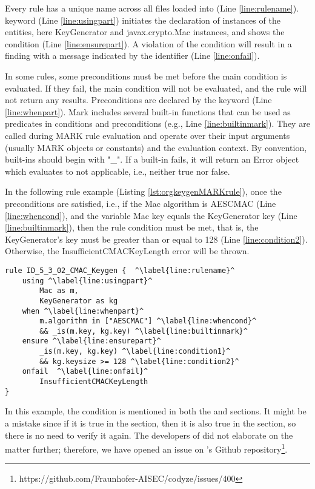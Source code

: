 Every rule has a unique name across all \MARK{} files loaded into \codyze{} (Line \ref{line:rulename}).  keyword (Line \ref{line:usingpart}) initiates the declaration of instances of the \MARK{} entities, here KeyGenerator and javax.crypto.Mac instances, and  shows the condition (Line \ref{line:ensurepart}). A violation of the condition will result in a finding with a message indicated by the  identifier (Line \ref{line:onfail}). 


In some rules, some preconditions must be met before the main condition is evaluated. If they fail, the main condition will not be evaluated, and the rule will not return any results. Preconditions are declared by the  keyword (Line \ref{line:whenpart}). Mark includes several built-in functions that can be used as predicates in conditions and preconditions (e.g., Line \ref{line:builtinmark}). They are called during MARK rule evaluation and operate over their input arguments (usually MARK objects or constants) and the evaluation context. By convention, built-ins should begin with "\_". If a built-in fails, it will return an Error object which evaluates to not applicable, i.e., neither true nor false. 

In the following rule example (Listing \ref{lst:orgkeygenMARKrule}), once the preconditions are satisfied, i.e., if the Mac algorithm is AESCMAC (Line \ref{line:whencond}), and the variable Mac key equals the KeyGenerator key (Line \ref{line:builtinmark}), then the rule condition must be met, that is, the KeyGenerator's key must be greater than or equal to 128 (Line \ref{line:condition2}). Otherwise, the InsufficientCMACKeyLength error will be thrown.

\begin{lstlisting}[language=MARK2,caption= A \MARK{} rule associated with javax.crypto.KeyGenerator class from Bouncy Castle ruleset \cite{codyzegit}., label={lst:orgkeygenMARKrule}, escapechar=^]
rule ID_5_3_02_CMAC_Keygen {  ^\label{line:rulename}^
    using ^\label{line:usingpart}^
        Mac as m,
        KeyGenerator as kg
    when ^\label{line:whenpart}^
        m.algorithm in ["AESCMAC"] ^\label{line:whencond}^
        && _is(m.key, kg.key) ^\label{line:builtinmark}^
    ensure ^\label{line:ensurepart}^
        _is(m.key, kg.key) ^\label{line:condition1}^
        && kg.keysize >= 128 ^\label{line:condition2}^
    onfail  ^\label{line:onfail}^
        InsufficientCMACKeyLength 
}
\end{lstlisting}

In this example, the condition  is mentioned in both the  and  sections. It might be a mistake since if it is true in the  section, then it is also true in the  section, so there is no need to verify it again. The developers of \codyze{} did not elaborate on the matter further; therefore, we have opened an issue on \codyze{}'s Github repository\footnote{https://github.com/Fraunhofer-AISEC/codyze/issues/400}.

